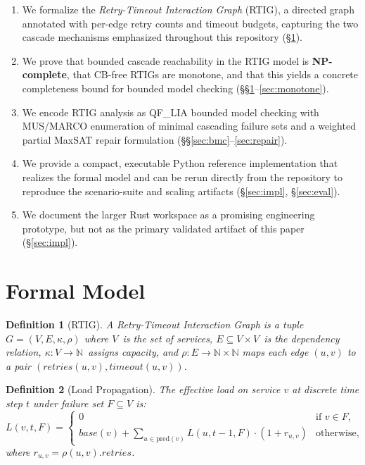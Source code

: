 \documentclass[10pt,twocolumn]{article}
\newcommand{\rtig}{RTIG\xspace}
\newtheorem{definition}{Definition}
\begin{document}
\begin{enumerate}[nosep]
\item We formalize the \emph{Retry-Timeout Interaction Graph} (\rtig), a
  directed graph annotated with per-edge retry counts and timeout budgets,
  capturing the two cascade mechanisms emphasized throughout this repository
  (\S\ref{sec:model}).

\item We prove that bounded cascade reachability in the RTIG model is
  \textbf{NP-complete}, that CB-free RTIGs are monotone, and that this yields a
  concrete completeness bound for bounded model checking
  (\S\S\ref{sec:model}--\ref{sec:monotone}).

\item We encode RTIG analysis as QF\_LIA bounded model checking with MUS/MARCO
  enumeration of minimal cascading failure sets and a weighted partial MaxSAT
  repair formulation (\S\S\ref{sec:bmc}--\ref{sec:repair}).

\item We provide a compact, executable Python reference implementation that
  realizes the formal model and can be rerun directly from the repository to
  reproduce the scenario-suite and scaling artifacts
  (\S\ref{sec:impl}, \S\ref{sec:eval}).

\item We document the larger Rust workspace as a promising engineering
  prototype, but not as the primary validated artifact of this paper
  (\S\ref{sec:impl}).
\end{enumerate}

\section{Formal Model}
\label{sec:model}

\begin{definition}[RTIG]
A \emph{Retry-Timeout Interaction Graph} is a tuple $G = (V, E, \kappa, \rho)$
where $V$~is the set of services, $E \subseteq V \times V$~is the dependency
relation, $\kappa: V \to \mathbb{N}$~assigns capacity, and
$\rho: E \to \mathbb{N} \times \mathbb{N}$ maps each edge $(u,v)$ to a pair
$(\mathit{retries}(u,v), \mathit{timeout}(u,v))$.
\end{definition}

\begin{definition}[Load Propagation]
The effective load on service $v$ at discrete time step $t$ under failure set
$F \subseteq V$ is:
\[
L(v, t, F) = \begin{cases}
0 & \text{if } v \in F, \\
\mathit{base}(v) + \displaystyle\sum_{u \in \mathrm{pred}(v)}
  L(u, t{-}1, F) \cdot (1 + r_{u,v}) & \text{otherwise},
\end{cases}
\]
where $r_{u,v} = \rho(u,v).\mathit{retries}$.
\end{definition}
\end{document}
